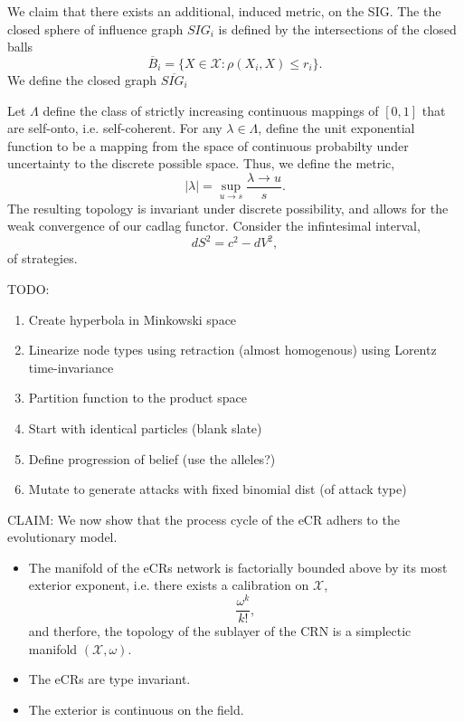 \documentclass[10pt]{article}
\newcommand{\mcX}{\mathcal{X}}
\theoremstyle{definition}
\begin{document}
We claim that there exists an additional, induced metric, on the
SIG. The the closed sphere of influence graph $SIG_i$ is defined by the intersections of the closed balls
$$
\overline{B}_i= \lbrace X \in \mcX : \rho(X_i, X) \le r_i\rbrace.
$$
We define the closed graph $\overline{SIG_i}$ 

Let $\Lambda$ define the class of strictly increasing continuous mappings of
$[0,1]$ that are self-onto, i.e. self-coherent. For any $\lambda \in \Lambda$,
define the unit exponential function to be a mapping from the space of
continuous probabilty under uncertainty to the discrete possible space. Thus, we
define the metric, 
$$
\vert \lambda \vert = \sup \limits_{u\rightarrow s}\frac{\lambda\rightarrow u}{s}.
$$
The resulting topology is invariant under discrete possibility, and allows for
the weak convergence of our cadlag functor. Consider the infintesimal interval, 
$$
dS^2 = c^2 - dV^2,
$$
of strategies.

TODO:
\begin{enumerate}
\item Create hyperbola in Minkowski space
\item Linearize node types using retraction (almost homogenous) using Lorentz
time-invariance 
\item Partition function to the product space
\item Start with identical particles (blank slate)
\item Define progression of belief (use the alleles?)
\item Mutate to generate attacks with fixed binomial dist (of attack type)
\end{enumerate}


CLAIM: We now show that the process cycle of the eCR adhers to the evolutionary
model.
\begin{itemize}
\item The manifold of the eCRs network is factorially bounded above by its
most exterior exponent, i.e. there exists a calibration on $\mcX$,
$$
\frac{\omega^k}{k!},
$$    
and therfore, the topology of the sublayer of the CRN is a simplectic
manifold $(\mcX,\omega)$. 
\item The eCRs are type invariant.
\item The exterior is continuous on the field.
\end{itemize}
\end{document}
